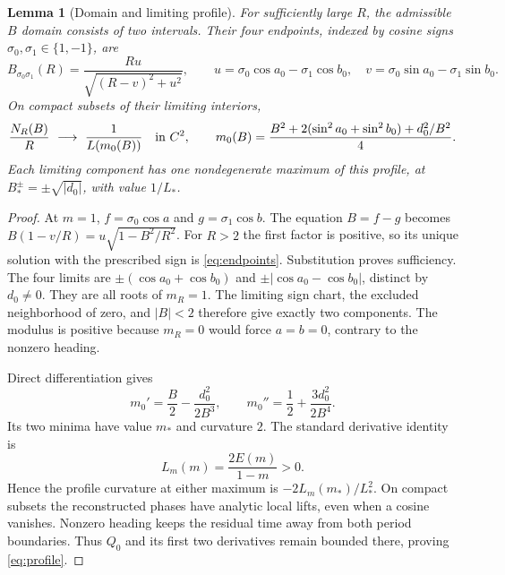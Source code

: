 \documentclass[11pt,a4paper]{article}
\newtheorem{lemma}[theorem]{Lemma}
\theoremstyle{remark}\newtheorem{remark}[theorem]{Remark}
\begin{document}
\begin{lemma}[Domain and limiting profile]\label{lem:domain}
For sufficiently large $R$, the admissible $B$ domain consists of two
intervals. Their four endpoints, indexed by cosine signs
$\sigma_0,\sigma_1\in\{1,-1\}$, are
\begin{equation}\label{eq:endpoints}
 B_{\sigma_0\sigma_1}(R)=\frac{Ru}{\sqrt{(R-v)^2+u^2}},\qquad
 u=\sigma_0\cos a_0-\sigma_1\cos b_0,\quad
 v=\sigma_0\sin a_0-\sigma_1\sin b_0.
\end{equation}
On compact subsets of their limiting interiors,
\begin{equation}\label{eq:profile}
 \frac{N_R(B)}R\ \longrightarrow\ \frac1{L(m_0(B))}
 \quad\hbox{in }C^2,\qquad
 m_0(B)=\frac{B^2+2(\sin^2a_0+\sin^2b_0)+d_0^2/B^2}{4}.
\end{equation}
Each limiting component has one nondegenerate maximum of this profile,
at $B_*^\pm=\pm\sqrt{|d_0|}$, with value $1/L_*$.
\end{lemma}
\begin{proof}
At $m=1$, $f=\sigma_0\cos a$ and $g=\sigma_1\cos b$.
The equation $B=f-g$ becomes
$B(1-v/R)=u\sqrt{1-B^2/R^2}$. For $R>2$ the first factor is positive,
so its unique solution with the prescribed sign is \eqref{eq:endpoints}.
Substitution proves sufficiency. The four limits are
$\pm(\cos a_0+\cos b_0)$ and
$\pm|\cos a_0-\cos b_0|$, distinct by $d_0\ne0$.
They are all roots of $m_R=1$. The limiting sign chart, the excluded
neighborhood of zero, and $|B|<2$ therefore give exactly two components.
The modulus is positive because $m_R=0$ would force $a=b=0$, contrary
to the nonzero heading.

Direct differentiation gives
\[
 m_0'=\frac B2-\frac{d_0^2}{2B^3},\qquad
 m_0''=\frac12+\frac{3d_0^2}{2B^4}.
\]
Its two minima have value $m_*$ and curvature $2$.
The standard derivative identity \cite[Section 19.4]{DLMF} is
\begin{equation}\label{eq:Lm}
 L_m(m)=\frac{2E(m)}{1-m}>0.
\end{equation}
Hence the profile curvature at either maximum is $-2L_m(m_*)/L_*^2$.
On compact subsets the reconstructed phases have analytic local lifts,
even when a cosine vanishes. Nonzero heading keeps the residual time
away from both period boundaries. Thus $Q_0$ and its first two derivatives
remain bounded there, proving \eqref{eq:profile}.
\end{proof}
\end{document}
